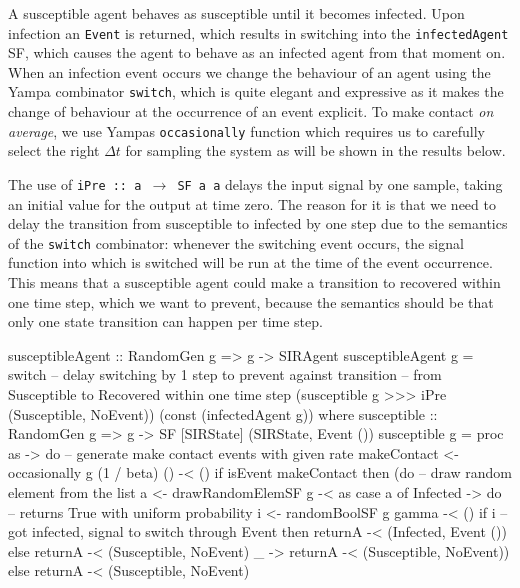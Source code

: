 A susceptible agent behaves as susceptible until it becomes infected. Upon infection an \texttt{Event} is returned, which results in switching into the \texttt{infectedAgent} SF, which causes the agent to behave as an infected agent from that moment on. When an infection event occurs we change the behaviour of an agent using the Yampa combinator \texttt{switch}, which is quite elegant and expressive as it makes the change of behaviour at the occurrence of an event explicit. To make contact \textit{on average}, we use Yampas \texttt{occasionally} function which requires us to carefully select the right $\Delta t$ for sampling the system as will be shown in the results below. 

The use of \texttt{iPre :: a $\rightarrow$ SF a a} delays the input signal by one sample, taking an initial value for the output at time zero. The reason for it is that we need to delay the transition from susceptible to infected by one step due to the semantics of the \texttt{switch} combinator: whenever the switching event occurs, the signal function into which is switched will be run at the time of the event occurrence. This means that a susceptible agent could make a transition to recovered within one time step, which we want to prevent, because the semantics should be that only one state transition can happen per time step.

\begin{HaskellCode}
susceptibleAgent :: RandomGen g => g -> SIRAgent
susceptibleAgent g 
    = switch 
      -- delay switching by 1 step to prevent against transition
      -- from Susceptible to Recovered within one time step
      (susceptible g >>> iPre (Susceptible, NoEvent)) 
      (const (infectedAgent g))
  where
    susceptible :: RandomGen g => g -> SF [SIRState] (SIRState, Event ())
    susceptible g = proc as -> do
      -- generate make contact events with given rate
      makeContact <- occasionally g (1 / beta) () -< ()
      if isEvent makeContact
        then (do
          -- draw random element from the list
          a <- drawRandomElemSF g -< as
          case a of
            Infected -> do
              -- returns True with uniform probability
              i <- randomBoolSF g gamma -< ()
              if i
                -- got infected, signal to switch through Event
                then returnA -< (Infected, Event ())
                else returnA -< (Susceptible, NoEvent)
             _       -> returnA -< (Susceptible, NoEvent))
        else returnA -< (Susceptible, NoEvent)
\end{HaskellCode}

